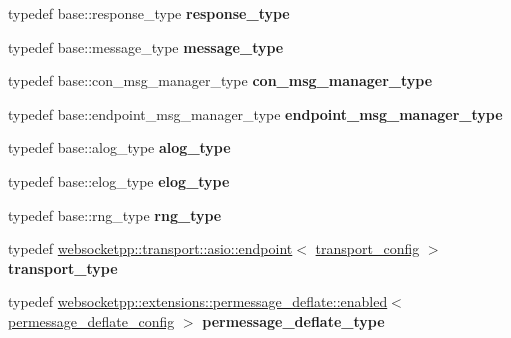 \begin{DoxyCompactItemize}
typedef base\+::response\+\_\+type {\bfseries response\+\_\+type}
\item 
\mbox{\label{structdeflate__config_ad09daf755c798d68e4165b26f5666c1b}} 
typedef base\+::message\+\_\+type {\bfseries message\+\_\+type}
\item 
\mbox{\label{structdeflate__config_a53ac00e73a66a9ac4d2ad1f35fdcc1e0}} 
typedef base\+::con\+\_\+msg\+\_\+manager\+\_\+type {\bfseries con\+\_\+msg\+\_\+manager\+\_\+type}
\item 
\mbox{\label{structdeflate__config_a7dc7b396942bf1257a1150e0f116b6f3}} 
typedef base\+::endpoint\+\_\+msg\+\_\+manager\+\_\+type {\bfseries endpoint\+\_\+msg\+\_\+manager\+\_\+type}
\item 
\mbox{\label{structdeflate__config_a8d100281307805500bfa56cbb31f40a2}} 
typedef base\+::alog\+\_\+type {\bfseries alog\+\_\+type}
\item 
\mbox{\label{structdeflate__config_a222cf9d7a150c9c9b72b85f08fd523ba}} 
typedef base\+::elog\+\_\+type {\bfseries elog\+\_\+type}
\item 
\mbox{\label{structdeflate__config_a89e44adf18198ce8594722ad54b327cd}} 
typedef base\+::rng\+\_\+type {\bfseries rng\+\_\+type}
\item 
\mbox{\label{structdeflate__config_a1df9e5f910e409686de46819564a10ec}} 
typedef \mbox{\hyperlink{classwebsocketpp_1_1transport_1_1asio_1_1endpoint}{websocketpp\+::transport\+::asio\+::endpoint}}$<$ \mbox{\hyperlink{structdeflate__config_1_1transport__config}{transport\+\_\+config}} $>$ {\bfseries transport\+\_\+type}
\item 
\mbox{\label{structdeflate__config_a17f7c627557e905cab80c4cc7c016a30}} 
typedef \mbox{\hyperlink{classwebsocketpp_1_1extensions_1_1permessage__deflate_1_1enabled}{websocketpp\+::extensions\+::permessage\+\_\+deflate\+::enabled}}$<$ \mbox{\hyperlink{structdeflate__config_1_1permessage__deflate__config}{permessage\+\_\+deflate\+\_\+config}} $>$ {\bfseries permessage\+\_\+deflate\+\_\+type}
\end{DoxyCompactItemize}
